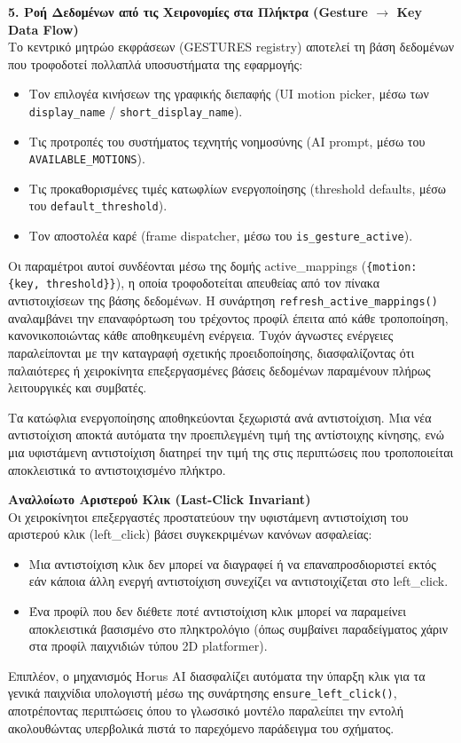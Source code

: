 \documentclass[twoside, a4paper, 11pt]{article}
\newcommand{\textlatin}[1]{\textenglish{#1}}
\begin{document}
\textbf{5. Ροή Δεδομένων από τις Χειρονομίες στα Πλήκτρα (\textlatin{Gesture $\rightarrow$ Key Data Flow})}\\
Το κεντρικό μητρώο εκφράσεων (\textlatin{GESTURES registry}) αποτελεί τη βάση δεδομένων που τροφοδοτεί πολλαπλά υποσυστήματα της εφαρμογής:
\begin{itemize}
    \item Τον επιλογέα κινήσεων της γραφικής διεπαφής (\textlatin{UI motion picker}, μέσω των \texttt{display\_name} / \texttt{short\_display\_name}).
    \item Τις προτροπές του συστήματος τεχνητής νοημοσύνης (\textlatin{AI prompt}, μέσω του \texttt{AVAILABLE\_MOTIONS}).
    \item Τις προκαθορισμένες τιμές κατωφλίων ενεργοποίησης (\textlatin{threshold defaults}, μέσω του \texttt{default\_threshold}).
    \item Τον αποστολέα καρέ (\textlatin{frame dispatcher}, μέσω του \texttt{is\_gesture\_active}).
\end{itemize}

Οι παραμέτροι αυτοί συνδέονται μέσω της δομής \textlatin{active\_mappings} (\texttt{\{motion: \{key, threshold\}\}}), η οποία τροφοδοτείται απευθείας από τον πίνακα αντιστοιχίσεων της βάσης δεδομένων. Η συνάρτηση \texttt{refresh\_active\_mappings()} αναλαμβάνει την επαναφόρτωση του τρέχοντος προφίλ έπειτα από κάθε τροποποίηση, κανονικοποιώντας κάθε αποθηκευμένη ενέργεια. Τυχόν άγνωστες ενέργειες παραλείπονται με την καταγραφή σχετικής προειδοποίησης, διασφαλίζοντας ότι παλαιότερες ή χειροκίνητα επεξεργασμένες βάσεις δεδομένων παραμένουν πλήρως λειτουργικές και συμβατές.

Τα κατώφλια ενεργοποίησης αποθηκεύονται ξεχωριστά ανά αντιστοίχιση. Μια νέα αντιστοίχιση αποκτά αυτόματα την προεπιλεγμένη τιμή της αντίστοιχης κίνησης, ενώ μια υφιστάμενη αντιστοίχιση διατηρεί την τιμή της στις περιπτώσεις που τροποποιείται αποκλειστικά το αντιστοιχισμένο πλήκτρο.

\textbf{Αναλλοίωτο Αριστερού Κλικ (\textlatin{Last-Click Invariant})}\\
Οι χειροκίνητοι επεξεργαστές προστατεύουν την υφιστάμενη αντιστοίχιση του αριστερού κλικ (\textlatin{left\_click}) βάσει συγκεκριμένων κανόνων ασφαλείας:
\begin{itemize}
    \item Μια αντιστοίχιση κλικ δεν μπορεί να διαγραφεί ή να επαναπροσδιοριστεί εκτός εάν κάποια άλλη ενεργή αντιστοίχιση συνεχίζει να αντιστοιχίζεται στο \textlatin{left\_click}.
    \item Ένα προφίλ που δεν διέθετε ποτέ αντιστοίχιση κλικ μπορεί να παραμείνει αποκλειστικά βασισμένο στο πληκτρολόγιο (όπως συμβαίνει παραδείγματος χάριν στα προφίλ παιχνιδιών τύπου \textlatin{2D platformer}).
\end{itemize}
Επιπλέον, ο μηχανισμός \textlatin{Horus AI} διασφαλίζει αυτόματα την ύπαρξη κλικ για τα γενικά παιχνίδια υπολογιστή μέσω της συνάρτησης \texttt{ensure\_left\_click()}, αποτρέποντας περιπτώσεις όπου το γλωσσικό μοντέλο παραλείπει την εντολή ακολουθώντας υπερβολικά πιστά το παρεχόμενο παράδειγμα του σχήματος.
\end{document}
